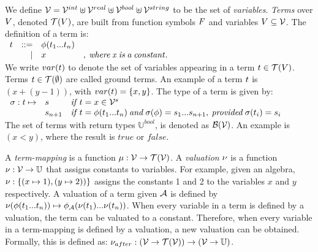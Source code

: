 We define $\mathcal{V} = \mathcal{V}^{int} \uplus \mathcal{V}^{real} \uplus \mathcal{V}^{bool} \uplus \mathcal{V}^{string}$ to be the set of \textit{variables}. \textit{Terms} over $V$, denoted $\mathcal{T}(V)$, are built from function symbols $F$ and variables $V \subseteq \mathcal{V}$. The definition of a term is:
\vspace{8px}\\
$\begin{array}{lrlr}t & ::= & \phi(t_1 ... t_n) &\\ & | & x&\mathit{,\: where\: x\: is\: a\: constant.}\end{array}$
\vspace{8px}\\
We write $var(t)$ to denote the set of variables appearing in a term $t \in \mathcal{T}(V)$. Terms $t\in \mathcal{T}(\emptyset)$ are called ground terms. An example of a term $t$ is $(x+(y-1))$, with $var(t) = \{x,y\}$. The type of a term is given by:
\vspace{8px}\\
$\begin{array}{lll}\sigma: t \mapsto & s       & \mathit{if}\: t = x \in \mathcal{V}^s \\ 
 & s_{n+1} & \mathit{if}\: t = \phi(t_1 ... t_n) \mathit{\:and\:} \sigma(\phi) = s_1 ... s_{n+1}\mathit{,\:provided\:} \sigma(t_i) = s_i
\end{array}$
\vspace{8px}\\
The set of terms with return types $\mathbb{U}^{bool}$, is denoted as $\mathcal{B}(\mathcal{V})$. An example is $(x < y)$, where the result is $\mathit{true}$ or $\mathit{false}$.

A \textit{term-mapping} is a function $\mu:\mathcal{V} \rightarrow \mathcal{T}(\mathcal{V})$. A \textit{valuation} $\nu$ is a function $\nu:\mathcal{V} \rightarrow \mathbb{U}$ that assigns constants to variables. For example, given an algebra, $\nu:\{(x \mapsto 1), (y \mapsto 2))\}$ assigns the constants 1 and 2 to the variables $x$ and $y$ respectively.
A valuation of a term given $\mathcal{A}$ is defined by $\nu(\phi(t_1 ... t_n)) \mapsto \phi_{\mathcal{A}}(\nu(t_1) ... \nu(t_n))$. When every variable in a term is defined by a valuation, the term can be valuated to a constant. Therefore, when every variable in a term-mapping is defined by a valuation, a new valuation can be obtained. Formally, this is defined as: $\nu_{after}:(\mathcal{V} \rightarrow \mathcal{T}(\mathcal{V})) \rightarrow (\mathcal{V} \rightarrow \mathbb{U})$.
